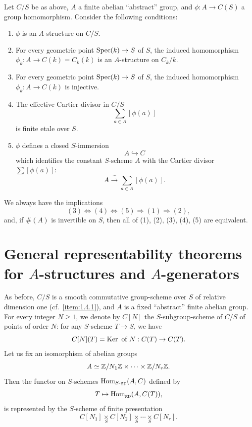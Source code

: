 \begin{lemma}\label{lem:1.5.3}
Let $C/S$ be as above, $A$ a finite abelian ``abstract'' group, and $\phi : A \to C(S)$ a group homomorphism. Consider the following conditions:
\begin{enumerate}[(1)]
\item $\phi$ is an $A$-structure on $C/S$.
\item For every geometric point $\operatorname{Spec}(k) \to S$ of $S$, the induced homomorphism $\phi_k : A \to C(k) = C_k(k)$ is an $A$-structure on $C_k/k$.
\item For every geometric point $\operatorname{Spec}(k) \to S$ of $S$, the induced homomorphism $\phi_k : A \to C(k)$ is injective.
\item The effective Cartier divisor in $C/S$
\[
\sum_{a \in A} [\phi(a)]
\]
is finite etale over $S$.
\item $\phi$ defines a closed $S$-immersion
\[
A \hookrightarrow C
\]
which identifies the constant $S$-scheme $A$ with the Cartier divisor $\sum [\phi(a)]$:
\[
A \xrightarrow{\ \sim\ } \sum_{a \in A} [\phi(a)].
\]
\end{enumerate}
We always have the implications
\[
(3) \Longleftrightarrow (4) \Longleftrightarrow (5) \Longrightarrow (1) \Longrightarrow (2),
\]
and, if $\#(A)$ is invertible on $S$, then all of (1), (2), (3), (4), (5) are equivalent.
\end{lemma}

\section{General representability theorems for \texorpdfstring{$A$}{A}-structures and \texorpdfstring{$A$}{A}-generators}\label{sec:1.6}

\kmitem\label{item:1.6.1}
As before, $C/S$ is a smooth commutative group-scheme over $S$ of relative dimension one (cf.~\ref{item:1.4.1}), and $A$ is a fixed ``abstract'' finite abelian group. For every integer $N \ge 1$, we denote by $C[N]$ the $S$-subgroup-scheme of $C/S$ of points of order $N$: for any $S$-scheme $T \to S$, we have
\[
C[N](T) = \operatorname{Ker} \text{ of } N : C(T) \to C(T).
\]
Let us fix an isomorphism of abelian groups
\begin{equation}\label{eq:1.6.1.1}
A \simeq \mathbb{Z}/N_1\mathbb{Z} \times \cdots \times \mathbb{Z}/N_r\mathbb{Z}.
\end{equation}
Then the functor on $S$-schemes $\operatorname{Hom}_{S\text{-}\mathrm{gp}}(A, C)$ defined by
\begin{equation}\label{eq:1.6.1.2}
T \mapsto \operatorname{Hom}_{\mathrm{gp}}(A, C(T)),
\end{equation}
is represented by the $S$-scheme of finite presentation
\begin{equation}\label{eq:1.6.1.3}
C[N_1] \underset{S}{\times} C[N_2] \underset{S}{\times} \cdots \underset{S}{\times} C[N_r].
\end{equation}

